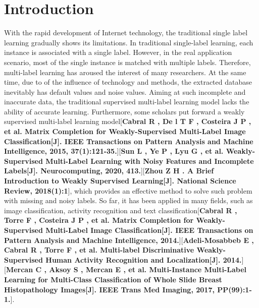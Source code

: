\documentclass[final,3p,times]{elsarticle}
\begin{document}
\section{Introduction}
With the rapid development of Internet technology, the traditional single label learning gradually shows its limitations. In traditional single-label learning, each instance is associated with a single label. However, in the real application scenario, most of the single instance is matched with multiple labels. Therefore, multi-label learning has aroused the interest of many researchers. At the same time, due to of the influence of technology and methods, the extracted database inevitably has default values and noise values. Aiming at such incomplete and inaccurate data, the traditional supervised multi-label learning model lacks the ability of accurate learning. Furthermore, some scholars put forward a weakly supervised multi-label learning model[\textbf{Cabral R , De l T F , Costeira J P , et al. Matrix Completion for Weakly-Supervised Multi-Label Image Classification[J]. IEEE Transactions on Pattern Analysis and Machine Intelligence, 2015, 37(1):121-35.}][\textbf{Sun L , Ye P , Lyu G , et al. Weakly-Supervised Multi-Label Learning with Noisy Features and Incomplete Labels[J]. Neurocomputing, 2020, 413.}][\textbf{Zhou Z H . A Brief Introduction to Weakly Supervised Learning[J]. National Science Review, 2018(1):1}], which provides an effective method to solve such problem with missing and noisy labels. So far, it has been applied in many fields, such as image classification, activity recognition and text classification[\textbf{Cabral R , Torre F , Costeira J P , et al. Matrix Completion for Weakly-Supervised Multi-Label Image Classification[J]. IEEE Transactions on Pattern Analysis and Machine Intelligence, 2014.}][\textbf{Adeli-Mosabbeb E , Cabral R , Torre F , et al. Multi-label Discriminative Weakly-Supervised Human Activity Recognition and Localization[J]. 2014.}][\textbf{Mercan C , Aksoy S , Mercan E , et al. Multi-Instance Multi-Label Learning for Multi-Class Classification of Whole Slide Breast Histopathology Images[J]. IEEE Trans Med Imaging, 2017, PP(99):1-1.}].
\end{document}
